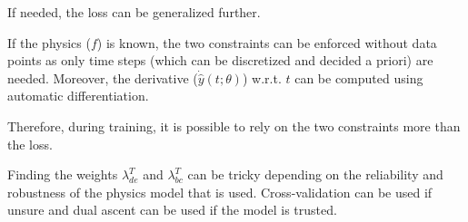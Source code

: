 \begin{description}
\begin{description}
                \begin{remark}
                    If needed, the loss can be generalized further.
                \end{remark}

                \begin{remark}
                    If the physics ($f$) is known, the two constraints can be enforced without data points as only time steps (which can be discretized and decided a priori) are needed. Moreover, the derivative ($\dot{\hat{y}}(t; \theta)$) w.r.t. $t$ can be computed using automatic differentiation.

                    Therefore, during training, it is possible to rely on the two constraints more than the loss.
                \end{remark}

                \begin{remark}
                    Finding the weights $\lambda_{de}^T$ and $\lambda_{bc}^T$ can be tricky depending on the reliability and robustness of the physics model that is used. Cross-validation can be used if unsure and dual ascent can be used if the model is trusted.
                \end{remark}
        \end{description}
\end{description}